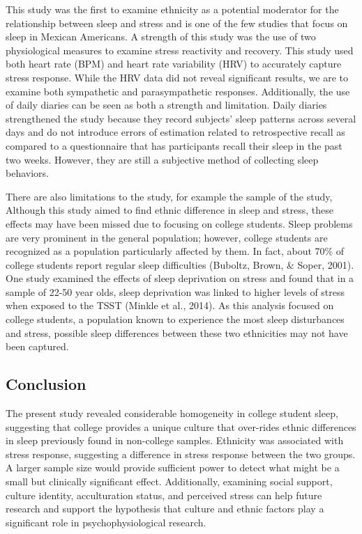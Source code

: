 \documentclass[man, fleqn, noextraspace]{apa6}
\begin{document}
This study was the first to examine ethnicity as a potential moderator for the relationship between sleep and stress and is one of the few studies that focus on sleep in Mexican Americans. A strength of this study was the use of two physiological measures to examine stress reactivity and recovery. This study used both heart rate (BPM) and heart rate variability (HRV) to accurately capture stress response. While the HRV data did not reveal significant results, we are to examine both sympathetic and parasympathetic responses. Additionally, the use of daily diaries can be seen as both a strength and limitation. Daily diaries strengthened the study because they record subjects' sleep patterns across several days and do not introduce errors of estimation related to retrospective recall as compared to a questionnaire that has participants recall their sleep in the past two weeks. However, they are still a subjective method of collecting sleep behaviors.

There are also limitations to the study, for example the sample of the study, Although this study aimed to find ethnic difference in sleep and stress, these effects may have been missed due to focusing on college students. Sleep problems are very prominent in the general population; however, college students are recognized as a population particularly affected by them. In fact, about 70\% of college students report regular sleep difficulties (Buboltz, Brown, \& Soper, 2001). One study examined the effects of sleep deprivation on stress and found that in a sample of 22-50 year olds, sleep deprivation was linked to higher levels of stress when exposed to the TSST (Minkle et al., 2014). As this analysis focused on college students, a population known to experience the most sleep disturbances and stress, possible sleep differences between these two ethnicities may not have been captured.

\hypertarget{conclusion}{%
\subsection{Conclusion}\label{conclusion}}

The present study revealed considerable homogeneity in college student sleep, suggesting that college provides a unique culture that over-rides ethnic differences in sleep previously found in non-college samples. Ethnicity was associated with stress response, suggesting a difference in stress response between the two groups. A larger sample size would provide sufficient power to detect what might be a small but clinically significant effect. Additionally, examining social support, culture identity, acculturation status, and perceived stress can help future research and support the hypothesis that culture and ethnic factors play a significant role in psychophysiological research.
\end{document}
